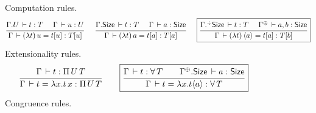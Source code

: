 \begin{figure}[htbp]
\flushleft
\hrulefill
\\[1ex]
Computation rules.
\begin{gather*}
  \ru{\cext \Gamma U \der t : T \quad \
      \Gamma \der u : U
    }{\Gamma \der (\lambda t)\,u = t[u] : T[u]}
\quad \
  \ru{\cext \Gamma \Size \der t : T \quad \
      \Gamma \der a : \Size
    }{\Gamma \der (\lambda t)\,a = t[a] : T[a]}
\quad \
\fbox{$
  \ru{\erext \Gamma \Size \der t : T \quad \
      \resurrect \Gamma \der a, b : \Size
    }{\Gamma \der (\lambda t)\,\ann a = t[a] : T[b]}
  $}
\end{gather*}
Extensionality rules.
\vspace{-1ex}
\begin{gather*}
  \ru{\Gamma \der t : \piT U T
    }{\Gamma \der t = \lambda x. t\,x : \piT U T}
\qquad
\fbox{$
  \ru{\Gamma \der t : \forallT T \qquad
      \cext {\resurrect\Gamma} \Size \der a : \Size
    }{\Gamma \der t = \lambda x. t \ann a : \forallT T}
  $}
\end{gather*}
Congruence rules.
\vspace{-2ex}

\end{figure}
